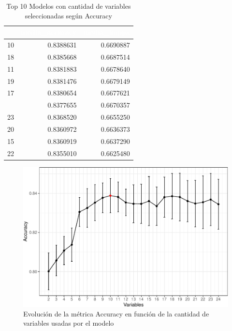\begin{table}[!h]
	
	\caption{\label{tab:top_10_rfe_accuracy}Top 10 Modelos con cantidad de variables seleccionadas según Accuracy}
	\centering
	\begin{tabular}[t]{rrr}
		\toprule
		\rowcolor{black}  \multicolumn{1}{c}{\textcolor{white}{\textbf{Variables}}} & \multicolumn{1}{c}{\textcolor{white}{\textbf{media\_accuracy}}} & \multicolumn{1}{c}{\textcolor{white}{\textbf{media\_kappa}}}\\
		\midrule
		\rowcolor{gray!6}  10 & 0.8388631 & 0.6690887\\
		18 & 0.8385668 & 0.6687514\\
		\rowcolor{gray!6}  11 & 0.8381883 & 0.6678640\\
		19 & 0.8381476 & 0.6679149\\
		\rowcolor{gray!6}  17 & 0.8380654 & 0.6677621\\
		\addlinespace
		9 & 0.8377655 & 0.6670357\\
		\rowcolor{gray!6}  23 & 0.8368520 & 0.6655250\\
		20 & 0.8360972 & 0.6636373\\
		\rowcolor{gray!6}  15 & 0.8360919 & 0.6637290\\
		22 & 0.8355010 & 0.6625480\\
		\bottomrule
	\end{tabular}
\end{table}

\begin{figure}[!htb]
	\centering
	\includegraphics{imagenes/variables/rfe_evolucion_accuracy-1.pdf}
	\caption{Evolución de la métrica Accuracy en función de la cantidad de variables usadas por el modelo}
	\label{fig:rfe_evolucion_accuracy}
\end{figure}

